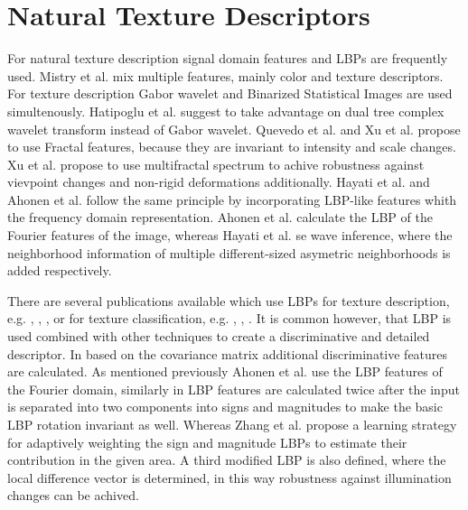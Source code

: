 \documentclass[draft,final]{vutinfth} %
\begin{document}
\section*{Natural Texture Descriptors}
\par
For natural texture description signal domain features and LBPs are frequently used.
Mistry et al. \cite{mistry2017content} mix multiple features, mainly color and texture descriptors.
For texture description Gabor wavelet and Binarized Statistical Images  \cite{kannala2012bsif} are used simultenously.
Hatipoglu et al. \cite{hatipoglu2000image} suggest to take advantage on dual tree complex wavelet transform instead of Gabor wavelet.
Quevedo et al. \cite{quevedo2002description} and Xu et al. \cite{xu2009viewpoint} propose to use Fractal features, because they are invariant to intensity and scale changes.
Xu et al. \cite{xu2009viewpoint} propose to use multifractal spectrum to achive robustness against vievpoint changes and non-rigid deformations additionally.
Hayati et al. \cite{hayati2018wirif} and Ahonen et al. \cite{ahonen2009rotation} follow the same principle by incorporating LBP-like features whith the frequency domain representation.
Ahonen et al. \cite{ahonen2009rotation} calculate the LBP of the Fourier features of the image, whereas Hayati et al. \cite{hayati2018wirif} se wave inference, where the neighborhood information of multiple different-sized asymetric neighborhoods is added respectively. 
\par
There are several publications available which use LBPs for texture description, e.g. \cite{guo2012discriminative}, \cite{hong2014combining}, \cite{ahonen2009rotation}, or for texture classification, e.g. \cite{khellah2011texture}, \cite{guo2010rotation}, \cite{zhang2017learning}.
It is common however, that LBP is used combined with other techniques to create a discriminative and detailed descriptor.
In \cite{hong2014combining} based on the covariance matrix additional discriminative features are calculated. 
As mentioned previously Ahonen et al. \cite{ahonen2009rotation} use the LBP features of the Fourier domain, similarly in \cite{guo2010completed} LBP features are calculated twice after the input is separated into two components into signs and magnitudes to make the basic LBP rotation invariant as well.
Whereas Zhang et al.  \cite{zhang2017learning} propose a learning strategy for adaptively weighting the sign and magnitude LBPs to estimate their contribution in the given area. 
A third modified LBP is also defined, where the local difference vector is determined, in this way robustness against illumination changes can be achived.
\end{document}
